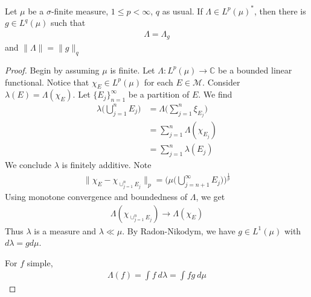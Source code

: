\begin{theorem}
  Let $\mu$ be a $\sigma$-finite measure, $1 \le p < \infty$, $q$ as
  usual. If $ \Lambda \in L^{p}(\mu)^*$, then there is $ g \in
  L^{q}(\mu)$ such that
  \begin{align*}
    \Lambda = \Lambda_g
  \end{align*}
  and $\|\Lambda\| = \|g\|_q$
\end{theorem}
\begin{proof}
  Begin by assuming $\mu$ is finite. Let $\Lambda : L^{p}(\mu) \to
  \mathbb{C}$ be a bounded linear functional. Notice that $\chi_E \in
  L^{p}(\mu)$ for each $E \in \mathcal{M}$. Consider $\lambda(E) =
  \Lambda(\chi_E)$. Let $\{E_j\}_{n = 1}^\infty$ be a partition of $E$. We find
  \begin{align*}
    \lambda \Big( \bigcup_{j = 1}^{n}E_j \Big) &= \Lambda \Big(
    \sum_{j = 1}^n \xi_{E_j} \Big) \\
    &= \sum_{j = 1}^{n} \Lambda(\chi_{E_j}) \\
    &= \sum_{ j = 1}^{n} \lambda(E_j)
  \end{align*}
  We conclude $\lambda$ is finitely additive. Note
  \begin{align*}
    \Big \| \chi_E - \chi_{\cup_{j = 1}^{n}E_j} \Big \|_p = \Big(
    \mu\big(\bigcup_{j = n+1}^{\infty} E_j\big)\Big)^{\frac{1}{p}}
  \end{align*}
  Using monotone convergence and boundedness of $\Lambda$, we get
  \begin{align*}
    \Lambda(  \chi_{\cup_{j = 1}^{n}E_j}) \to \Lambda(\chi_E)
  \end{align*}
  Thus $\lambda$ is a measure and $\lambda \ll \mu$. By
  Radon-Nikodym, we have $g \in L^{1}(\mu)$ with $d \lambda = g d \mu$.

  For $f$ simple,
  \begin{align*}
    \Lambda(f) = \int f \ d \lambda = \int fg \ d \mu
  \end{align*}
\end{proof}
